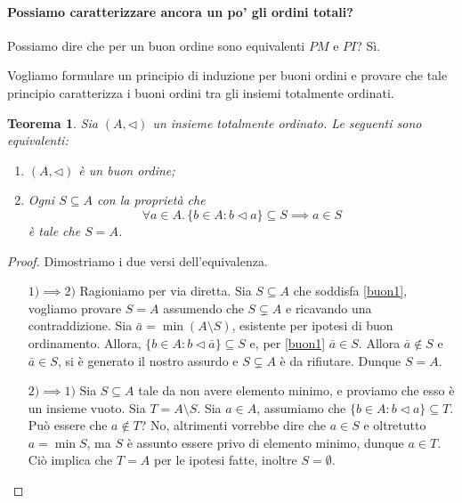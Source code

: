 \documentclass[fontsize = 11 pt, paper=A4, oneside, index=totoc, hyperref]{article}
\theoremstyle{definition}
\theoremstyle{plain}
\newtheorem{thm}{Teorema}[section]
\begin{document}
\paragraph{Possiamo caratterizzare ancora un po' gli ordini totali?} Possiamo dire che per un buon ordine sono equivalenti \(PM\) e \(PI\)? Sì.

Vogliamo formulare un principio di induzione per buoni ordini e provare che tale principio caratterizza i buoni ordini tra gli insiemi totalmente ordinati.
\begin{thm}
  Sia \((A,\lhd)\) un insieme totalmente ordinato. Le seguenti sono equivalenti:
  \begin{enumerate}
    \item \((A,\lhd)\) è un buon ordine;
    \item Ogni \(S \subseteq A\) con la proprietà che
    \begin{equation}
      \forall a \in A.\, \lbrace b \in A \colon b \lhd a\rbrace \subseteq S \implies a \in S \label{buon1}
      \end{equation} è tale che \(S = A\).
  \end{enumerate}
\end{thm}
\begin{proof} Dimostriamo i due versi dell'equivalenza.
  \begin{itemize}
    \item[\(1) \implies 2)\)] Ragioniamo per via diretta. Sia \(S \subseteq A\) che soddisfa \eqref{buon1}, vogliamo provare \(S = A\) assumendo che \(S \subsetneq A\) e ricavando una contraddizione. Sia \(\bar{a} = \min (A \setminus S)\), esistente per ipotesi di buon ordinamento. Allora, \(\lbrace b \in A \colon b \lhd \bar{a} \rbrace \subseteq S\) e, per \eqref{buon1} \(\bar{a} \in S\). Allora \(\bar{a} \notin S\) e \(\bar{a} \in S\), si è generato il nostro assurdo e \(S \subsetneq A\) è da rifiutare. Dunque \(S = A\).
    \item[\(2) \implies 1)\)] Sia \(S \subseteq A\) tale da non avere elemento minimo, e proviamo che esso è un insieme vuoto. Sia \(T = A \setminus S\). Sia \(a \in A\), assumiamo che \(\lbrace b \in A \colon b \lhd a \rbrace \subseteq T\). Può essere che \(a \notin T\)? No, altrimenti vorrebbe dire che \(a \in S\) e oltretutto \(a = \min S\), ma \(S\) è assunto essere privo di elemento minimo, dunque \(a \in T\). Ciò implica che \(T = A\) per le ipotesi fatte, inoltre \(S = \emptyset\).
  \end{itemize}
\end{proof}
\end{document}
